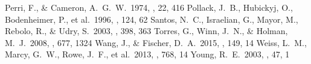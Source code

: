 \documentclass[twocolumn, dvipdfmx]{aastex62}
\begin{document}
\begin{CJK*}{UTF8}{min}
\begin{thebibliography}{}
 Perri, F., \& Cameron, A.~G.~W.\ 1974, \icarus, 22, 416
 Pollack, J.~B., Hubickyj, O., Bodenheimer, P., et al.\ 1996, \icarus, 124, 62
 Santos, N.~C., Israelian, G., Mayor, M., Rebolo, R., \& Udry, S.\ 2003, \aap, 398, 363
 Torres, G., Winn, J.~N., \& Holman, M.~J.\ 2008, \apj, 677, 1324
 Wang, J., \& Fischer, D.~A.\ 2015, \aj, 149, 14
 Weiss, L.~M., Marcy, G.~W., Rowe, J.~F., et al.\ 2013, \apj, 768, 14
 Young, R.~E.\ 2003, \nar, 47, 1

\end{thebibliography}


\end{CJK*}
\end{document}
